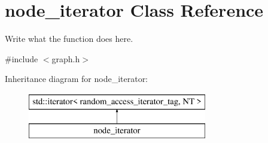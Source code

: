 \hypertarget{classnode__iterator}{\section{node\+\_\+iterator Class Reference}
\label{classnode__iterator}
}


Write what the function does here.  




{\ttfamily \#include $<$graph.\+h$>$}

Inheritance diagram for node\+\_\+iterator\+:\begin{figure}[H]
\begin{center}
\leavevmode
\includegraphics[height=2.000000cm]{classnode__iterator}
\end{center}
\end{figure}
